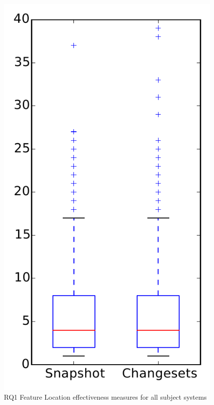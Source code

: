 
\begin{figure}
\centering
\includegraphics[height=0.4\textheight]{figures/flt/rq1_overview}
\caption{RQ1 Feature Location effectiveness measures for all subject systems}
\label{fig:flt:rq1:overview}
\end{figure}
